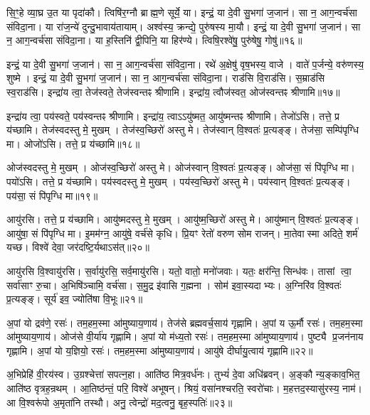 सि॒ꣳ॒हे व्या॒घ्र उ॒त या पृदा॑कौ।
त्विषि॑र॒ग्नौ ब्राह्म॒णे सूर्ये॒ या।
इन्द्रं॒ या दे॒वी सु॒भगा॑ ज॒जान॑।
सा न॒ आग॒न्वर्च॑सा संविदा॒ना।
या रा॑ज॒न्ये॑ दुन्दु॒भावाय॑तायाम्।
अश्व॑स्य॒ क्रन्द्ये॒ पुरु॑षस्य मा॒यौ।
इन्द्रं॒ या दे॒वी सु॒भगा॑ ज॒जान॑।
सा न॒ आग॒न्वर्च॑सा संविदा॒ना।
या ह॒स्तिनि॑ द्वी॒पिनि॒ या हिर॑ण्ये।
त्विषि॒रश्वे॑षु॒ पुरु॑षेषु॒ गोषु॑॥१६॥

इन्द्रं॒ या दे॒वी सु॒भगा॑ ज॒जान॑।
सा न॒ आग॒न्वर्च॑सा संविदा॒ना।
रथे॑ अ॒क्षेषु॑ वृष॒भस्य॒ वाजे।
वाते॑ प॒र्जन्ये॒ वरु॑णस्य॒ शुष्मे।
इन्द्रं॒ या दे॒वी सु॒भगा॑ ज॒जान॑।
सा न॒ आग॒न्वर्च॑सा संविदा॒ना।
राड॑सि वि॒राड॑सि।
स॒म्राड॑सि स्व॒राड॑सि।
इन्द्रा॑य त्वा॒ तेज॑स्वते॒ तेज॑स्वन्तꣴ श्रीणामि।
इन्द्रा॑य॒ त्वौज॑स्वत॒ ओज॑स्वन्तꣴ श्रीणामि॥१७॥

इन्द्रा॑य त्वा॒ पय॑स्वते॒ पय॑स्वन्तꣴ श्रीणामि।
इन्द्रा॑य॒ त्वा\-ऽऽयु॑ष्मत॒ आयु॑ष्मन्तꣴ श्रीणामि।
तेजो॑ऽसि।
तत्ते॒ प्र य॑च्छामि।
तेज॑स्वदस्तु मे॒ मुखम्।
तेज॑स्व॒च्छिरो॑ अस्तु मे।
तेज॑स्वान् वि॒श्वतः॑ प्र॒त्यङ्ङ्।
तेज॑सा॒ सम्पि॑पृग्धि मा।
ओजो॑ऽसि।
तत्ते॒ प्र य॑च्छामि॥१८॥

ओज॑स्वदस्तु मे॒ मुखम्।
ओज॑स्व॒च्छिरो॑ अस्तु मे।
ओज॑स्वान् वि॒श्वतः॑ प्र॒त्यङ्ङ्।
ओज॑सा॒ सं पि॑पृग्धि मा।
पयो॑ऽसि।
तत्ते॒ प्र य॑च्छामि।
पय॑स्वदस्तु मे॒ मुखम्।
पय॑स्व॒च्छिरो॑ अस्तु मे।
पय॑स्वान् वि॒श्वतः॑ प्र॒त्यङ्ङ्।
पय॑सा॒ सं पि॑पृग्धि मा॥१९॥

आयु॑रसि।
तत्ते॒ प्र य॑च्छामि।
आयु॑ष्मदस्तु मे॒ मुखम्।
आयु॑ष्म॒च्छिरो॑ अस्तु मे।
आयु॑ष्मान् वि॒श्वतः॑ प्र॒त्यङ्ङ्।
आयु॑षा॒ सं पि॑पृग्धि मा।
इ॒मम॑ग्न॒ आयु॑षे॒ वर्च॑से कृधि।
प्रि॒यꣳ रेतो॑ वरुण सोम राजन्।
मा॒तेवास्मा अदिते॒ शर्म॑ यच्छ।
विश्वे॑ देवा॒ जर॑दष्टि॒र्यथा\-ऽस॑त्॥२०॥

आयु॑रसि वि॒श्वायु॑रसि।
स॒र्वायु॑रसि॒ सर्व॒मायु॑रसि।
यतो॒ वातो॒ मनो॑जवाः।
यतः॒ क्षर॑न्ति॒ सिन्ध॑वः।
तासां त्वा॒ सर्वा॑साꣳ रु॒चा।
अ॒भिषि॑ञ्चामि॒ वर्च॑सा।
स॒मु॒द्र इ॑वासि ग॒ह्मना।
सोम॑ इवा॒स्यदाभ्यः।
अ॒ग्निरि॑व वि॒श्वतः॑ प्र॒त्यङ्ङ्।
सूर्य॑ इव॒ ज्योति॑षा वि॒भूः॥२१॥

अ॒पां यो द्रव॑णे॒ रसः॑।
तम॒हम॒स्मा आ॑मुष्याय॒णाय॑।
तेज॑से ब्रह्मवर्च॒साय॑ गृह्णामि।
अ॒पां य ऊ॒र्मौ रसः॑।
तम॒हम॒स्मा आ॑मुष्याय॒णाय॑।
ओज॑से वी॒र्या॑य गृह्णामि।
अ॒पां यो म॑ध्य॒तो रसः॑।
तम॒हम॒स्मा आ॑मुष्याय॒णाय॑।
पुष्ट्यै प्र॒जन॑नाय गृह्णामि।
अ॒पां यो य॒ज्ञियो॒ रसः॑।
तम॒हम॒स्मा आ॑मुष्याय॒णाय॑।
आयु॑षे दीर्घायु॒त्वाय॑ गृह्णामि॥२२॥\anuvakamend[गोष्वोज॑स्वन्तꣴ श्रीणा॒म्योजो॑ऽसि॒ तत्ते॒ प्रय॑च्छामि॒ पय॑सा॒ सम्पि॑पृग्धि॒ माऽस॑द्वि॒भूर्य॒ज्ञियो॒ रसो॒ द्वे च॑]

अ॒भिप्रेहि॑ वी॒रय॑स्व।
उ॒ग्रश्चेत्ता॑ सपत्न॒हा।
आति॑ष्ठ मित्र॒वर्ध॑नः।
तुभ्यं॑ दे॒वा अधि॑ब्रवन्।
अ॒ङ्कौ न्य॒ङ्काव॒भित॒ आति॑ष्ठ वृत्रह॒न्रथम्।
आ॒तिष्ठ॑न्तं॒ परि॒ विश्वे॑ अभूषन्।
श्रियं॒ वसा॑नश्चरति॒ स्वरो॑चाः।
म॒हत्तद॒स्यासु॑रस्य॒ नाम॑।
आ वि॒श्वरू॑पो अ॒मृता॑नि तस्थौ।
अनु॒ त्वेन्द्रो॑ मद॒त्वनु॒ बृह॒स्पतिः॑॥२३॥

